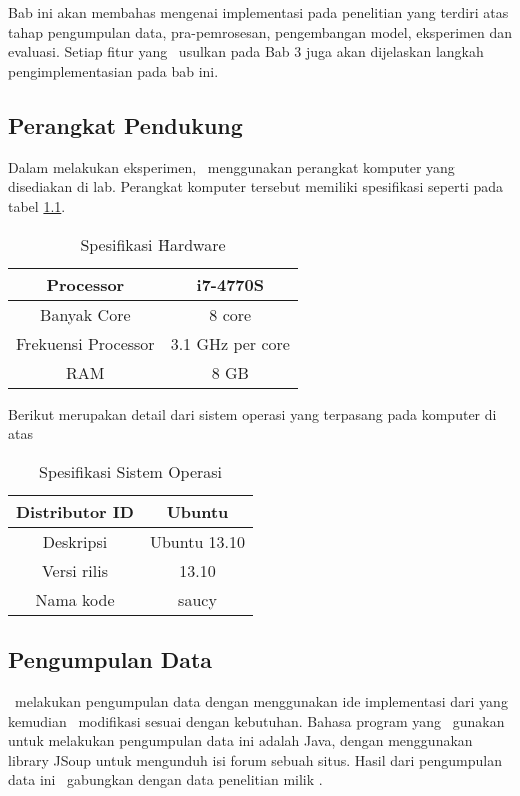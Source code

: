 \chapter{\babEmpat} \label{eksperimen}

Bab ini akan membahas mengenai implementasi pada penelitian yang terdiri atas tahap pengumpulan data, pra-pemrosesan, pengembangan model, eksperimen dan evaluasi. Setiap fitur yang \saya~usulkan pada Bab 3 juga akan dijelaskan langkah pengimplementasian pada bab ini.

\section{Perangkat Pendukung}
Dalam melakukan eksperimen, \saya~menggunakan perangkat komputer yang disediakan di lab. Perangkat komputer tersebut memiliki spesifikasi seperti pada tabel \ref{table:spesifikasi hardware}.

\begin{table}
	\centering
	\caption{Spesifikasi \f{Hardware}}
	\begin{tabular}{|c|c|}
		\hline
		Processor & i7-4770S \\ \hline
		Banyak Core & 8 core \\ \hline
		Frekuensi Processor & 3.1 GHz per core \\ \hline
		RAM & 8 GB \\ \hline
	\end{tabular}
	\label{table:spesifikasi hardware}
\end{table}

Berikut merupakan detail dari sistem operasi yang terpasang pada komputer di atas
\begin{table}
	\centering
	\caption{Spesifikasi Sistem Operasi}
	\begin{tabular}{|c|c|}
		\hline
		Distributor ID & Ubuntu \\ \hline
		Deskripsi & Ubuntu 13.10 \\ \hline
		Versi rilis & 13.10 \\ \hline
		Nama kode & saucy \\ \hline
	\end{tabular}
	\label{table:spesifikasi os}
\end{table}

\section{Pengumpulan Data}
\Saya~melakukan pengumpulan data dengan menggunakan ide implementasi dari \cite{skripsiKakRadit} yang kemudian \saya~modifikasi sesuai dengan kebutuhan. Bahasa program yang \saya~gunakan untuk melakukan pengumpulan data ini adalah Java, dengan menggunakan library JSoup untuk mengunduh isi forum sebuah situs. Hasil dari pengumpulan data ini \saya~gabungkan dengan data penelitian milik \cite{skripsiKakRadit}.

